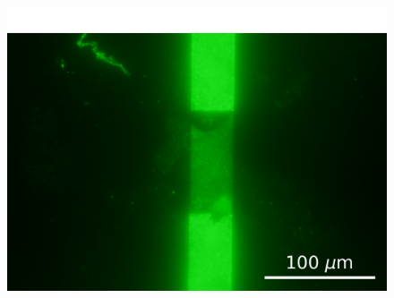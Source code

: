 \documentclass[
  a4paper,
]{scrbook}
\begin{document}
\begin{figure}
\begin{minipage}[t]{0.47\linewidth}
{{\includegraphics{figures/ch6/modified_GFPOR_PBASE_10sexposure_40X_mediumcontrast_ch3_231019.png}

}

}

\subcaption{\label{fig-PBASE-GFP-OR-ch3}}
\end{minipage}%
\newline
\begin{minipage}[t]{0.47\linewidth}

{\centering 


}
\end{minipage}
\end{figure}
\end{document}
